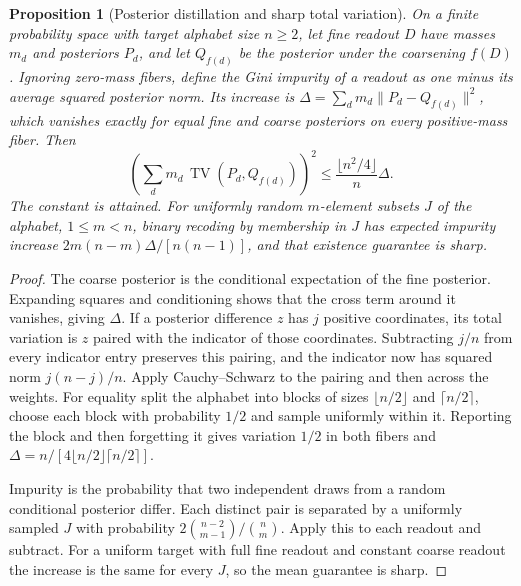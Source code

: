 \documentclass[aps,pra,onecolumn,superscriptaddress,nofootinbib,10pt]{revtex4-2}
\newtheorem{proposition}[theorem]{Proposition}
\theoremstyle{definition}
\theoremstyle{remark}
\begin{document}
\begin{proposition}[Posterior distillation and sharp total variation]\label{ob:gini}
On a finite probability space with target alphabet size $n\ge2$,
let fine readout $D$ have masses $m_d$ and posteriors $P_d$,
and let $Q_{f(d)}$ be the posterior under the coarsening $f(D)$.
Ignoring zero-mass fibers, define the Gini impurity of a readout as
one minus its average squared posterior norm. Its increase is
$\Delta=\sum_d m_d\|P_d-Q_{f(d)}\|^2$, which vanishes exactly for
equal fine and coarse posteriors on every positive-mass fiber.
Then
\[
 \left(\sum_d m_d\,\operatorname{TV}(P_d,Q_{f(d)})\right)^2
 \le \frac{\lfloor n^2/4\rfloor}{n}\Delta .
\]
The constant is attained. For uniformly random $m$-element
subsets $J$ of the alphabet, $1\le m<n$, binary recoding by
membership in $J$ has expected impurity increase
$2m(n-m)\Delta/[n(n-1)]$, and that existence guarantee is sharp.
\end{proposition}
\begin{proof}
The coarse posterior is the conditional expectation of the fine
posterior. Expanding squares and conditioning shows that the
cross term around it vanishes, giving $\Delta$. If a posterior
difference $z$ has $j$ positive coordinates, its total variation
is $z$ paired with the indicator of those coordinates. Subtracting
$j/n$ from every indicator entry preserves this pairing, and the
indicator now has squared norm $j(n-j)/n$. Apply Cauchy--Schwarz
to the pairing and then across the weights. For equality split the
alphabet into blocks of sizes $\lfloor n/2\rfloor$ and
$\lceil n/2\rceil$, choose each block with probability $1/2$ and
sample uniformly within it. Reporting the block and then forgetting
it gives variation $1/2$ in both fibers and
$\Delta=n/[4\lfloor n/2\rfloor\lceil n/2\rceil]$.

Impurity is the probability that two independent draws from a
random conditional posterior differ. Each distinct pair is
separated by a uniformly sampled $J$ with probability
$2\binom{n-2}{m-1}/\binom{n}{m}$. Apply this to each readout
and subtract. For a uniform target with full fine readout and
constant coarse readout the increase is the same for every $J$,
so the mean guarantee is sharp.
\end{proof}
\end{document}
